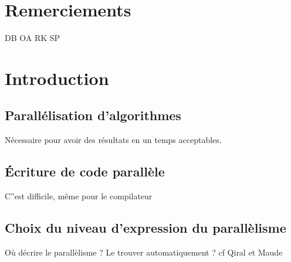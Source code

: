 \documentclass[11pt,onecolumn]{report}
\begin{document}


\tableofcontents






\chapter*{Remerciements}

DB OA RK SP

\chapter{Introduction}

\section{Parallélisation d'algorithmes}

Nécessaire pour avoir des résultats en un temps acceptables.

\section{\'Ecriture de code parallèle}

C''est difficile, même pour le compilateur

\section{Choix du niveau d'expression du parallèlisme}

Où décrire le parallèlisme ? Le trouver automatiquement ?
cf Qiral et Maude
\end{document}
